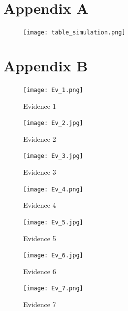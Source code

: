 \documentclass[12pt]{report}
\begin{document}
	\chapter*{Appendix A}
	\begin{figure}
		\centering
		\texttt{[image: table\_simulation.png]}
		\label{fig:simulations_table}
	\end{figure}
	
	\pagebreak
	\chapter*{Appendix B}
	
	\begin{multicols}{2}
		
		\begin{figure}
			\centering
			\texttt{[image: Ev\_1.png]}
			\caption{Evidence 1}
			\label{fig:ev_1}
		\end{figure}
		
		\begin{figure}
			\centering
			\texttt{[image: Ev\_2.jpg]}
			\caption{Evidence 2}
			\label{fig:ev_2}
		\end{figure}
		
		\begin{figure}
			\centering
			\texttt{[image: Ev\_3.jpg]}
			\caption{Evidence 3}
			\label{fig:ev_3}
		\end{figure}
		
		\begin{figure}
			\centering
			\texttt{[image: Ev\_4.png]}
			\caption{Evidence 4}
			\label{fig:ev_4}
		\end{figure}
		
		\begin{figure}
			\centering
			\texttt{[image: Ev\_5.jpg]}
			\caption{Evidence 5}
			\label{fig:ev_5}
		\end{figure}
		
		\begin{figure}
			\centering
			\texttt{[image: Ev\_6.jpg]}
			\caption{Evidence 6}
			\label{fig:ev_6}
		\end{figure}
		
		\begin{figure}
			\centering
			\texttt{[image: Ev\_7.png]}
			\caption{Evidence 7}
			\label{fig:ev_7}
		\end{figure}
	\end{multicols}
	
	
	
	\pagebreak
	\printbibliography
	\thispagestyle{empty}
	
\end{document}
